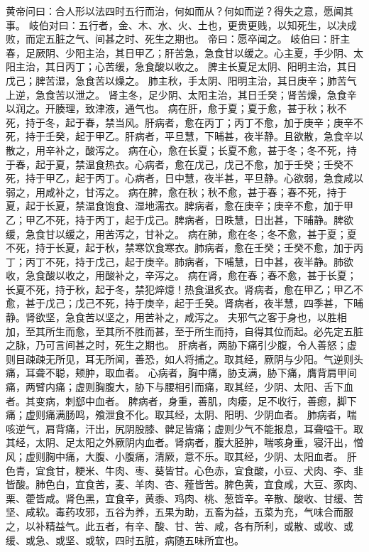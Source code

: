 \documentclass[a4paper,12pt,UTF8,twoside]{ctexbook}
\begin{document}
黄帝问曰：合人形以法四时五行而治，何如而从？何如而逆？得失之意，愿闻其事。
岐伯对曰：五行者，金、木、水、火、土也，更贵更贱，以知死生，以决成败，而定五脏之气、间甚之时、死生之期也。
帝曰：愿卒闻之。
岐伯曰：肝主春，足厥阴、少阳主治，其日甲乙；肝苦急，急食甘以缓之。心主夏，手少阴、太阳主治，其日丙丁；心苦缓，急食酸以收之。
脾主长夏足太阴、阳明主治，其日戊己；脾苦湿，急食苦以燥之。
肺主秋，手太阴、阳明主治，其日庚辛；肺苦气上逆，急食苦以泄之。
肾主冬，足少阴、太阳主治，其日壬癸；肾苦燥，急食辛以润之。开腠理，致津液，通气也。
病在肝，愈于夏；夏于愈，甚于秋；秋不死，持于冬，起于春，禁当风。肝病者，愈在丙丁；丙丁不愈，加于庚辛；庚辛不死，持于壬癸，起于甲乙。肝病者，平旦慧，下晡甚，夜半静。且欲散，急食辛以散之，用辛补之，酸泻之。
病在心，愈在长夏；长夏不愈，甚于冬；冬不死，持于春，起于夏，禁温食热衣。心病者，愈在戊己，戊己不愈，加于壬癸；壬癸不死，持于甲乙，起于丙丁。心病者，日中慧，夜半甚，平旦静。心欲弱，急食咸以弱之，用咸补之，甘泻之。
病在脾，愈在秋；秋不愈，甚于春；春不死，持于夏，起于长夏，禁温食饱食、湿地濡衣。脾病者，愈在庚辛；庚辛不愈，加于甲乙；甲乙不死，持于丙丁，起于戊己。脾病者，日昳慧，日出甚，下晡静。脾欲缓，急食甘以缓之，用苦泻之，甘补之。
病在肺，愈在冬；冬不愈，甚于夏；夏不死，持于长夏，起于秋，禁寒饮食寒衣。肺病者，愈在壬癸；壬癸不愈，加于丙丁；丙丁不死，持于戊己，起于庚辛。肺病者，下哺慧，日中甚，夜半静。肺欲收，急食酸以收之，用酸补之，辛泻之。
病在肾，愈在春；春不愈，甚于长夏；长夏不死，持于秋，起于冬，禁犯焠燱！热食温炙衣。肾病者，愈在甲乙；甲乙不愈，甚于戊己；戊己不死，持于庚辛，起于壬癸。肾病者，夜半慧，四季甚，下晡静。肾欲坚，急食苦以坚之，用苦补之，咸泻之。
夫邪气之客于身也，以胜相加，至其所生而愈，至其所不胜而甚，至于所生而持，自得其位而起。必先定五脏之脉，乃可言间甚之时，死生之期也。
肝病者，两胁下痛引少腹，令人善怒；虚则目疎疎无所见，耳无所闻，善恐，如人将捕之。取其经，厥阴与少阳。气逆则头痛，耳聋不聪，颊肿，取血者。
心病者，胸中痛，胁支满，胁下痛，膺背肩甲间痛，两臂内痛；虚则胸腹大，胁下与腰相引而痛，取其经，少阴、太阳、舌下血者。其变病，刺郄中血者。
脾病者，身重，善肌，肉痿，足不收行，善瘛，脚下痛；虚则痛满肠鸣，飧泄食不化。取其经，太阴、阳明、少阴血者。
肺病者，喘咳逆气，肩背痛，汗出，尻阴股膝、髀足皆痛；虚则少气不能报息，耳聋嗌干。取其经，太阴、足太阳之外厥阴内血者。肾病者，腹大胫肿，喘咳身重，寝汗出，憎风；虚则胸中痛，大腹、小腹痛，清厥，意不乐。取其经，少阴、太阳血者。
肝色青，宜食甘，粳米、牛肉、枣、葵皆甘。心色赤，宜食酸，小豆、犬肉、李、韭皆酸。肺色白，宜食苦，麦、羊肉、杏、薤皆苦。脾色黄，宜食咸，大豆、豕肉、栗、藿皆咸。肾色黑，宜食辛，黄黍、鸡肉、桃、葱皆辛。辛散、酸收、甘缓、苦坚、咸软。毒药攻邪，五谷为养，五果为助，五畜为益，五菜为充，气味合而服之，以补精益气。此五者，有辛、酸、甘、苦、咸，各有所利，或散、或收、或缓、或急、或坚、或软，四时五脏，病随五味所宜也。
\end{document}
